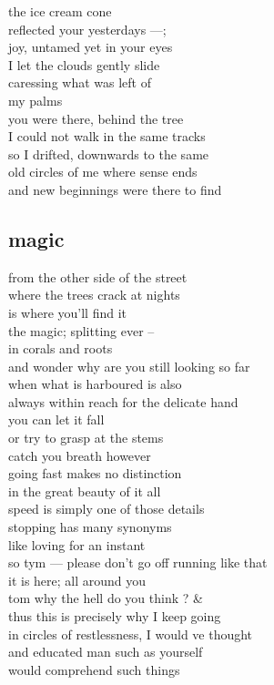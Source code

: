 \documentclass{article}
\begin{document}
the ice cream cone\\
reflected your yesterdays ---;\\
joy, untamed yet in your eyes\\
I let the clouds gently slide\\
caressing what was left of\\
my palms\\

you were there, behind the tree\\
I could not walk in the same tracks\\
so I drifted, downwards to the same\\
old circles of me where sense ends\\
and new beginnings were there to find\\
\clearpage

\subsection{magic}


from the other side of the street\\
where the trees crack at nights\\
is where you'll find it\\
the magic; splitting ever --\\
in corals and roots\\
and wonder why are you still looking so far\\
when what is harboured is also\\
always within reach for the delicate hand\\

you can let it fall\\
or try to grasp at the stems\\
catch you breath however\\
going fast makes no distinction\\
in the great beauty of it all\\
speed is simply one of those details\\

stopping has many synonyms\\
like loving for an instant\\
so tym --- please don't go off running like that\\
it is here; all around you\\
tom why the hell do you think ? \& \\
thus this is precisely why I keep going\\
in circles of restlessness, I would ve thought\\
and educated man such as yourself\\
would comprehend such things\\
\clearpage
\end{document}
